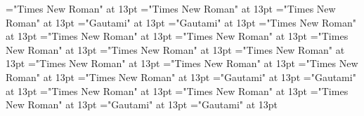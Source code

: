 \documentclass[a4paper,twoside]{article}
\begin{document}
\font\CmPossibilitypublishStemTransTypeNamePubenspanspanspansensespanentryletDatadicBody="Times New Roman" at 13pt
\font\spanenCmPossibilitypublishStemTransTypeNamePubenspanspanspansensespanentryletDatadicBody="Times New Roman" at 13pt
\font\spanenspanspanspansensespanentryletDatadicBody="Times New Roman" at 13pt
\font\translationLdtespanspansensespanentryletDatadicBody="Gautami" at 13pt
\font\spantetranslationLdtespanspansensespanentryletDatadicBody="Gautami" at 13pt
\font\spanentranslationLdtespanspansensespanentryletDatadicBody="Times New Roman" at 13pt
\font\spanenspansensespanentryletDatadicBody="Times New Roman" at 13pt
\font\semanticdomainabbrenspansensespanentryletDatadicBody="Times New Roman" at 13pt
\font\spanensemanticdomainabbrenspansensespanentryletDatadicBody="Times New Roman" at 13pt
\font\semanticdomainnameenspansensespanentryletDatadicBody="Times New Roman" at 13pt
\font\spanensemanticdomainnameenspansensespanentryletDatadicBody="Times New Roman" at 13pt
\font{}="Times New Roman" at 13pt
\font\xitemendefinitionLdensensespanentryletDatadicBody="Times New Roman" at 13pt
\font\spanenxitemendefinitionLdensensespanentryletDatadicBody="Times New Roman" at 13pt
\font\spanendefinitionLdensensespanentryletDatadicBody="Times New Roman" at 13pt
\font\xitemtedefinitionLdensensespanentryletDatadicBody="Gautami" at 13pt
\font\spantexitemtedefinitionLdensensespanentryletDatadicBody="Gautami" at 13pt
\font\LexSensepublishStemGlossPubLdensensespanentryletDatadicBody="Times New Roman" at 13pt
\font\xitemenLexSensepublishStemGlossPubLdensensespanentryletDatadicBody="Times New Roman" at 13pt
\font\spanenxitemenLexSensepublishStemGlossPubLdensensespanentryletDatadicBody="Times New Roman" at 13pt
\font\xitemteLexSensepublishStemGlossPubLdensensespanentryletDatadicBody="Gautami" at 13pt
\font\spantexitemteLexSensepublishStemGlossPubLdensensespanentryletDatadicBody="Gautami" at 13pt
\end{document}
